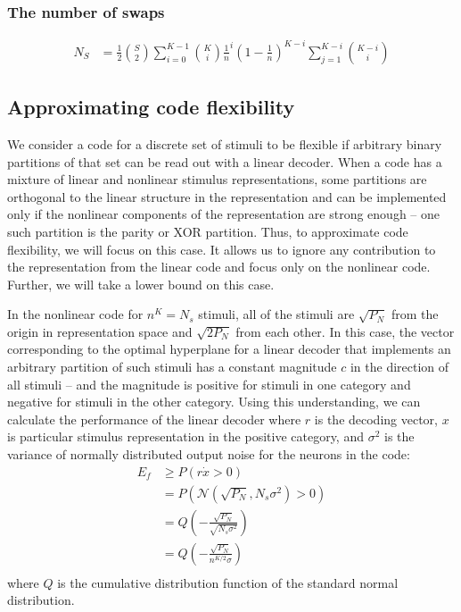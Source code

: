 \documentclass[letter,12pt]{article}
\begin{document}
\subsubsection*{The number of swaps}
\begin{align}
  N_{S} &= \frac{1}{2} \binom{S}{2} \sum_{i = 0}^{K - 1}
  \binom{K}{i} \frac{1}{n}^{i} \left(1 - \frac{1}{n}\right)^{K - i}
  \sum_{j = 1}^{K - i} \binom{K - i}{i}
\end{align}

\subsection{Approximating code flexibility}
We consider a code for a discrete set of stimuli to be flexible if arbitrary
binary partitions of that set can be read out with a linear decoder. When a code
has a mixture of linear and nonlinear stimulus representations, some partitions
are orthogonal to the linear structure in the representation and can be
implemented only if the nonlinear components of the representation are strong
enough -- one such partition is the parity or XOR partition. Thus, to approximate
code flexibility, we will focus on this case. It allows us to ignore any
contribution to the representation from the linear code and focus only on the
nonlinear code. Further, we will take a lower bound on this case. 

In the nonlinear code for $n^{K} = N_{s}$ stimuli, all of the stimuli are
$\sqrt{P_{N}}$ from the origin in representation space and $\sqrt{2P_{N}}$ from
each other. In this case, the vector corresponding to the optimal hyperplane for
a linear decoder that
implements an arbitrary partition of such stimuli has a constant magnitude
$c$ in the direction of all stimuli -- and the magnitude is positive for
stimuli in one category and negative for stimuli in the other category. Using
this understanding, we can calculate the performance of the linear decoder where
$r$ is the decoding vector, $x$ is particular stimulus representation in the
positive category, and $\sigma^{2}$ is the variance of normally distributed output
noise for the neurons in the code:
\begin{align}
  E_{f} &\geq P(r \dot x > 0) \\
  &= P(\mathcal{N}(\sqrt{P_{N}}, N_{s} \sigma^{2}) > 0) \\
  &= Q\left(-\frac{\sqrt{P_{N}}}{\sqrt{N_{s}\sigma^{2}}}\right) \\
  &= Q\left(-\frac{\sqrt{P_{N}}}{n^{K/2} \sigma}\right) \\
\end{align}
where $Q$ is the cumulative distribution function of the standard normal
distribution.
\end{document}
